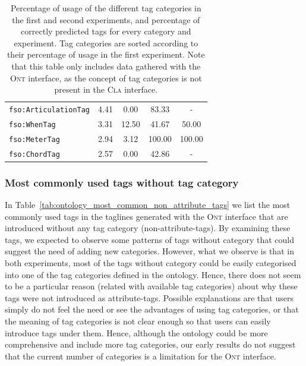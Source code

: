\begin{table}
\begin{center}
\begin{tabular}{@{}lcccc@{}}
\texttt{fso:ArticulationTag} & 4.41 & 0.00 & 83.33 & - \\
\texttt{fso:WhenTag} & 3.31 & 12.50 & 41.67 & 50.00 \\
\texttt{fso:MeterTag} & 2.94 & 3.12 & 100.00 & 100.00 \\
\texttt{fso:ChordTag} & 2.57 & 0.00 & 42.86 & - \\
\bottomrule
\end{tabular}
\caption[Percentage of usage and percentage of correctly predicted tags per tag category]{Percentage of usage of the different tag categories in the first and second experiments, and percentage of correctly predicted tags for every category and experiment. Tag categories are sorted according to their percentage of usage in the first experiment. Note that this table only includes data gathered with the \textsc{Ont} interface, as the concept of tag categories is not present in the \textsc{Cla} interface.}
\label{tab:tag_categories_usage}
\end{center}
\end{table}

\subsubsection{Most commonly used tags without tag category}

In Table~\ref{tab:ontology_most_common_non_attribute_tags} we list the most commonly used tags in the taglines generated with the \textsc{Ont} interface that are introduced without any tag category (non-attribute-tags). By examining these tags, we expected to observe some patterns of tags without category that could suggest the need of adding new categories. 
However, what we observe is that in both experiments, most of the tags without category could be easily categorised into one of the tag categories defined in the ontology. Hence, there does not seem to be a particular reason (related with available tag categories) about why these tags were not introduced as attribute-tags. 
Possible explanations are that users simply do not feel the need or see the advantages of using tag categories, or that the meaning of tag categories is not clear enough so that users can easily introduce tags under them.
Hence, although the ontology could be more comprehensive and include more tag categories, our early results do not suggest that the current number of categories is a limitation for the \textsc{Ont} interface. 



